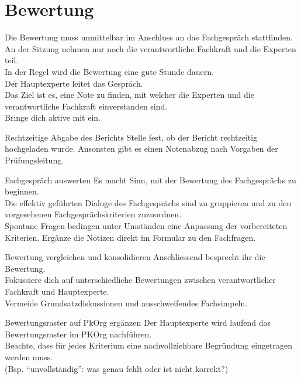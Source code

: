 \section{Bewertung}
Die Bewertung muss unmittelbar im Anschluss an das Fachgespräch stattfinden.\\
An der Sitzung nehmen nur noch die verantwortliche Fachkraft und die Experten teil.\\
In der Regel wird die Bewertung eine gute Stunde dauern.\\
Der Hauptexperte leitet das Gespräch.\\
Das Ziel ist es, eine Note zu finden, mit welcher die Experten und die verantwortliche Fachkraft einverstanden sind.\\
Bringe dich aktive mit ein.
\begin{taskitem}{Rechtzeitige Abgabe des Berichts}
  Stelle fest, ob der Bericht rechtzeitig hochgeladen wurde. Ansonsten gibt es einen Notenabzug nach Vorgaben der Prüfungsleitung.
\end{taskitem}
\begin{taskitemwithoutcomment}{Fachgespräch auswerten}
  Es macht Sinn, mit der Bewertung des Fachgesprächs zu beginnen.\\
  Die effektiv geführten Dialoge des Fachgesprächs sind zu gruppieren und zu den vorgesehenen Fachgesprächskriterien zuzuordnen.\\
  Spontane Fragen bedingen unter Umständen eine Anpassung der vorbereiteten Kriterien.
  Ergänze die Notizen direkt im Formular zu den Fachfragen.
\end{taskitemwithoutcomment}
\begin{taskitemwithoutcomment}{Bewertung vergleichen und konsolidieren}
  Anschliessend besprecht ihr die Bewertung.\\
  Fokussiere dich auf unterschiedliche Bewertungen zwischen verantwortlicher Fachkraft und Hauptexperte.\\
  Vermeide Grundsatzdiskussionen und ausschweifendes Fachsimpeln.
\end{taskitemwithoutcomment}
\begin{taskitemwithoutcomment}{Bewertungsraster auf PkOrg ergänzen}
  Der Hauptexperte wird laufend das Bewertungsraster im PKOrg nachführen.\\
  Beachte, dass für jedes Kriterium eine nachvollziehbare Begründung eingetragen werden muss.\\
  (Bsp. \enquote{unvollständig}: was genau fehlt oder ist nicht korrekt?)\\
\end{taskitemwithoutcomment}
